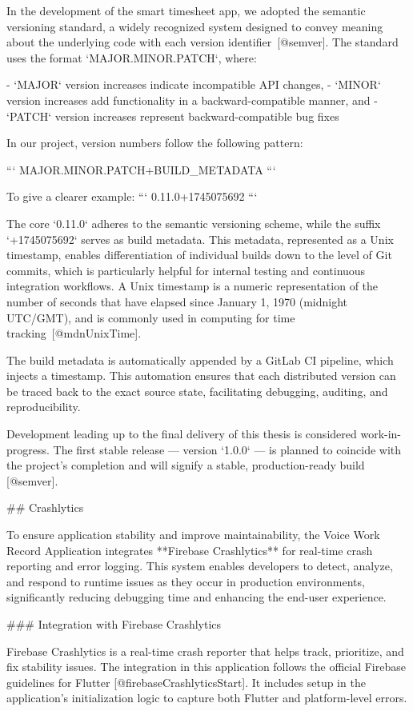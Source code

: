 \documentclass[
  digital,     %
  oneside,     %
  nosansbold,  %
  nocolorbold, %
  lof,         %
  lot,         %
]{fithesis4}
\begin{document}
\begin{markdown}
In the development of the smart timesheet app, we adopted the semantic versioning standard, a widely recognized system designed to convey meaning about the underlying code with each version identifier~[@semver]. The standard uses the format `MAJOR.MINOR.PATCH`, where:

- `MAJOR` version increases indicate incompatible API changes,
- `MINOR` version increases add functionality in a backward-compatible manner, and
- `PATCH` version increases represent backward-compatible bug fixes

In our project, version numbers follow the following pattern:

```
MAJOR.MINOR.PATCH+BUILD_METADATA
```

To give a clearer example:
```
0.11.0+1745075692
```

The core `0.11.0` adheres to the semantic versioning scheme, while the suffix `+1745075692` serves as build metadata. This metadata, represented as a Unix timestamp, enables differentiation of individual builds down to the level of Git commits, which is particularly helpful for internal testing and continuous integration workflows. A Unix timestamp is a numeric representation of the number of seconds that have elapsed since January 1, 1970 (midnight UTC/GMT), and is commonly used in computing for time tracking~[@mdnUnixTime].

The build metadata is automatically appended by a GitLab CI pipeline, which injects a timestamp. This automation ensures that each distributed version can be traced back to the exact source state, facilitating debugging, auditing, and reproducibility.

Development leading up to the final delivery of this thesis is considered work-in-progress. The first stable release — version `1.0.0` — is planned to coincide with the project's completion and will signify a stable, production-ready build [@semver].

## Crashlytics

To ensure application stability and improve maintainability, the Voice Work Record Application integrates **Firebase Crashlytics** for real-time crash reporting and error logging. This system enables developers to detect, analyze, and respond to runtime issues as they occur in production environments, significantly reducing debugging time and enhancing the end-user experience.

### Integration with Firebase Crashlytics

Firebase Crashlytics is a real-time crash reporter that helps track, prioritize, and fix stability issues. The integration in this application follows the official Firebase guidelines for Flutter [@firebaseCrashlyticsStart]. It includes setup in the application’s initialization logic to capture both Flutter and platform-level errors.


\end{markdown}
\end{document}
